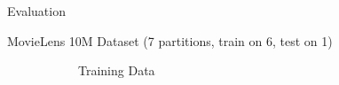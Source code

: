 \documentclass[final]{beamer}
\begin{document}
{\begin{frame}{}
\begin{center}
\begin{columns}[t]
\begin{column}{0.32\textwidth}
\begin{block}{\huge Evaluation}
\begin{itemize}
{\item MovieLens 10M Dataset (7 partitions, train on 6, test on 1)
\begin{figure}
	\begin{subfigure}[b]{.45\textwidth}
\begin{center}
		\caption{Training Data}
\end{center}
	\end{subfigure}
\hspace{1cm}
	\begin{subfigure}[b]{.45\textwidth}
\begin{center}

\end{center}
\end{subfigure}
\end{figure}}
\end{itemize}
\end{block}
\end{column}
\end{columns}
\end{center}
\end{frame}}
\end{document}
